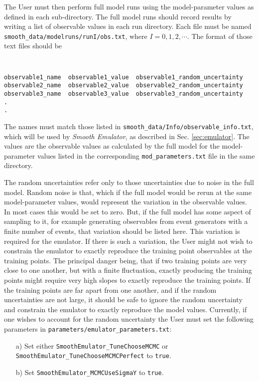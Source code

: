 \documentclass[UserManual.tex]{subfiles}
\begin{document}
The User must then perform full model runs using the model-parameter values as defined in each sub-directory. The full model runs should record results by writing a list of observable values in each run directory. Each file must be named {\tt smooth\_data/modelruns/runI/obs.txt}, where $I=0,1,2,\cdots$. The format of those text files should be
{\tt
\begin{verbatim}
observable1_name  observable1_value  observable1_random_uncertainty
observable2_name  observable2_value  observable2_random_uncertainty
observable3_name  observable3_value  observable3_random_uncertainty
.
.
\end{verbatim}
}
The names must match those listed in {\tt smooth\_data/Info/observable\_info.txt}, which will be used by {\it Smooth Emulator}, as described in Sec. \ref{sec:emulator}. The values are the observable values as calculated by the full model for the model-parameter values listed in the corresponding {\tt mod\_parameters.txt} file in the same directory.

The random uncertainties refer only to those uncertainties due to noise in the full model. Random noise is that, which if the full model would be rerun at the same model-parameter values, would represent the variation in the observable values. In most cases this would be set to zero. But, if the full model has some aspect of sampling to it, for example generating observables from event generators with a finite number of events, that variation should be listed here. This variation is required for the emulator. If there is such a variation, the User might not wish to constrain the emulator to exactly reproduce the training point observables at the training points. The principal danger being, that if two training points are very close to one another, but with a finite fluctuation, exactly producing the training points might require very high slopes to exactly reproduce the training points. If the training points are far apart from one another, and if the random uncertainties are not large, it should be safe to ignore the random uncertainty and constrain the emulator to exactly reproduce the model values. Currently, if one wishes to account for the random uncertainty the User must set the following parameters in {\tt parameters/emulator\_parameters.txt}:
\begin{itemize}\itemsep=0pt
\item [a)] Set either {\tt SmoothEmulator\_TuneChooseMCMC} or {\tt SmoothEmulator\_TuneChooseMCMCPerfect} to {\tt true}. 
\item [b)] Set {\tt SmoothEmulator\_MCMCUseSigmaY} to {\tt true}.
\end{itemize}
\end{document}
